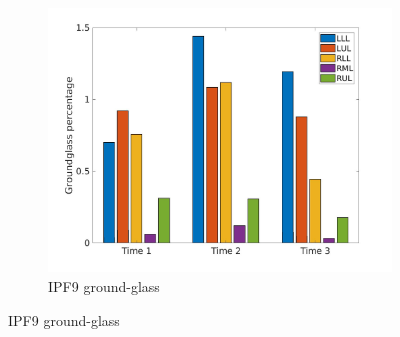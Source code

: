\begin{figure}[H] 
\centering
\begin{subfigure}{.46\linewidth}%
  \includegraphics[width=\linewidth,trim={{.0\wd0} {.0\wd0} {.0\wd0} {.0\wd0}},clip]{Appendix/Image_AppexA/LobarDistribution/IPF9GroundglassLobarRegionDiseaseDistributionOverTime.jpg} %
  \caption{IPF9 ground-glass}
  \label{fig:IPF9LobarRegionDiseaseDistributionOverTime-a} 
\end{subfigure} 
\hspace{.3in}

\end{figure}
